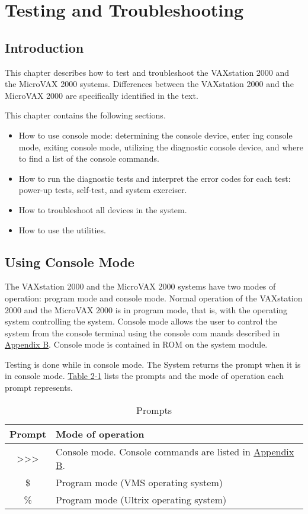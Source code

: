 \chapter{Testing and Troubleshooting}
\setcounter{page}{1}

\section{Introduction}

This chapter describes how to test and troubleshoot the VAXstation 2000
and the MicroVAX 2000 systems. Differences between the VAXstation 2000
and the MicroVAX 2000 are specifically identified in the text.

This chapter contains the following sections.

\begin{itemize}
\item How to use console mode: determining the console device, enter
ing console mode, exiting console mode, utilizing the diagnostic
console device, and where to find a list of the console commands.
\item How to run the diagnostic tests and interpret the error codes for
each test: power-up tests, self-test, and system exerciser.
\item How to troubleshoot all devices in the system.
\item How to use the utilities.
\end{itemize}

\section{Using Console Mode}

The VAXstation 2000 and the MicroVAX 2000 systems have two modes
of operation: program mode and console mode. Normal operation of the
VAXstation 2000 and the MicroVAX 2000 is in program mode, that is, with
the operating system controlling the system. Console mode allows the user
to control the system from the console terminal using the console com
mands described in \hyperlink{appendix.b}{Appendix B}. Console mode is contained in ROM on
the system module.

Testing is done while in console mode. The System returns the \console
prompt when it is in console mode. \hyperref[table:2-1]{Table 2-1} lists the prompts and the
mode of operation each prompt represents.

\begin{table}[H]
\caption{Prompts}
\label{table:2-1}
\begin{tabularx}{\textwidth}{c l}
\hline
\textbf{Prompt} & \textbf{Mode of operation}\\
\hline
{>}{>}{>} & Console mode. Console commands are listed in \hyperlink{appendix.b}{Appendix B}. \\
\$ & Program mode (VMS operating system) \\
\% & Program mode (Ultrix operating system) \\
\hline
\end{tabularx}
\end{table}


